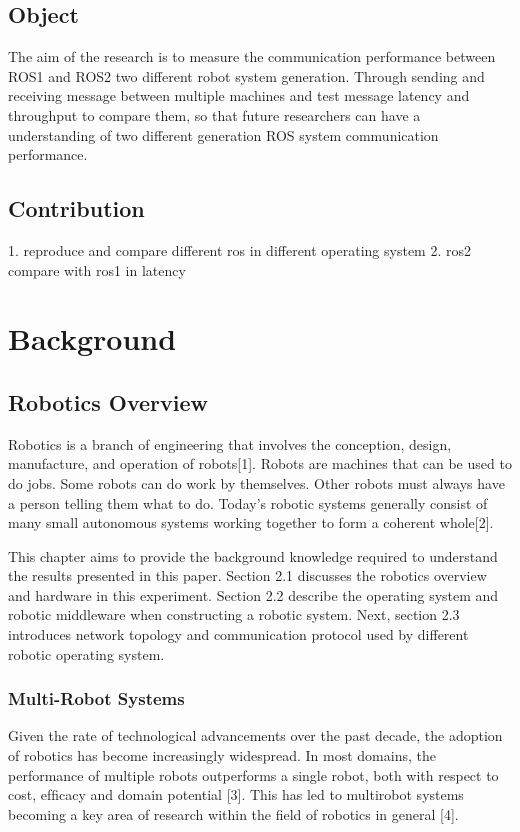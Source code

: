 \documentclass{mproj}
\begin{document}
\section{Object}
The aim of the research is to measure the communication performance between ROS1 and ROS2 two different robot system generation. Through sending and receiving message between multiple machines and test message latency and throughput to compare them, so that future researchers can have a understanding of two different generation ROS system communication performance.

\section{Contribution}
1. reproduce and compare different ros in different operating system
2. ros2 compare with ros1 in latency

\chapter{Background}\label{background}

\section{Robotics Overview}
Robotics is a branch of engineering that involves the conception, design, manufacture, and operation of robots[1]. Robots are machines that can be used to do jobs. Some robots can do work by themselves. Other robots must always have a person telling them what to do. Today’s robotic systems generally consist of many small autonomous systems working together to form a coherent whole[2].

This chapter aims to provide the background knowledge required to understand the results presented in this paper. Section 2.1 discusses the robotics overview and hardware in this experiment. Section 2.2 describe the operating system and robotic middleware when constructing a robotic system. Next, section 2.3 introduces network topology and communication protocol used by different robotic operating system. 

\subsection{Multi-Robot Systems}
Given the rate of technological advancements over the past decade, the adoption of robotics has become increasingly widespread. In most domains, the performance of multiple robots outperforms a single robot, both with respect to cost, efﬁcacy and domain potential [3]. This has led to multirobot systems becoming a key area of research within the ﬁeld of robotics in general [4].
\end{document}
